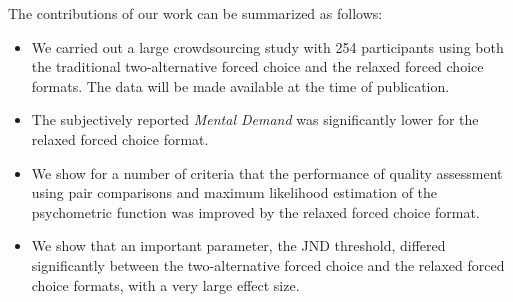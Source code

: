 \documentclass[a4paper,conference]{IEEEtran}
\begin{document}



The contributions of our work can be summarized as follows:
\begin{itemize}
    \item We carried out a large crowdsourcing study with 254 participants using both the traditional two-alternative forced choice and the relaxed forced choice  formats. The data will be made available at the time of publication. 
    \item The subjectively reported \textit{Mental Demand} was significantly lower for the relaxed forced choice format. %
    \item We show for a number of criteria that the performance of quality assessment using pair comparisons and maximum likelihood estimation of the psychometric function was improved by the relaxed forced choice format.
    \item We show that an important parameter, the JND threshold, differed significantly between the two-alternative forced choice and the relaxed forced choice formats, with a very large effect size.
\end{itemize}
\end{document}
